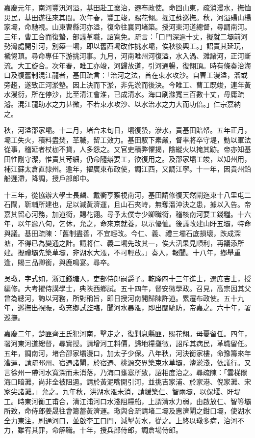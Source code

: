 \begin{pinyinscope}
嘉慶元年，南河豐汛河溢，基田赴工襄治，遷布政使。命回山東，疏消漫水，撫恤災民，基田遂往來其間。次年春，豐工竣，賜花翎。擢江蘇巡撫。秋，河溢碭山楊家壩，命馳視。山東曹縣河亦溢，復命往襄同堵築。授河東河道總督，尋調南河。三年，曹工合而復蟄，部議革職，詔寬免。疏言：「口門深逾十丈，擬就二壩前河勢灣處開引河，別築一壩，即以舊西壩改作挑水壩，俟秋後興工。」詔責其延玩，褫翎頂。尋命專任下游挑河事。九月，河南睢州河復溢，水入渦、濉諸河，正河斷流。大工旋合。次年春，睢工亦竣，河歸故道，引河通暢，復翎頂。時有條奏治海口及復舊制混江龍者，基田疏言：「治河之法，首在束水攻沙。自曹工漫溢，溜或旁趨，遂致正河淤墊。因上決而下淤，非先淤而後決。今睢工、曹工既竣，連年黃水漫衍，所在停沙，比至清江會淮，已成清水。海口刷滌寬三百數十丈，毋庸疏濬。混江龍助水之力甚微，不若束水攻沙、以水治水之力大而功倍。」仁宗嘉納之。

秋，河溢邵家壩。十二月，堵合未旬日，壩復蟄，滲水，責基田賠帑。五年正月，壩工失火，積料盡焚，革職，留工效力。基田馭下素嚴，督率將卒守堤，動以軍法從事，稽延者杖枷不貸，人多怨之。又官吏積弊懼揭，陰縱火以掩其跡。帝亦知基田性剛守潔，惟責其苛細，仍命隨辦要工，欲復用之。及邵家壩工竣，以知州用，補江蘇太倉直隸州。逾年，擢廣東布政使，調江西，又調江寧。十一年，因貴州鉛船遲滯，降調，授戶部郎中。

十三年，從協辦大學士長麟、戴衢亨察視南河，基田請修復天然閘迤東十八里屯二石閘，靳輔所建也，足以減黃濟運，且山石夾峙，無奪溜沖決之患，據以入告。帝嘉其留心河務，加道銜，賜花翎。尋予太僕寺少卿職銜，稽核南河要工錢糧。十六年，以年逾八旬，乞休，允之，命來京就養，以示優恤。後議改建山盱五壩，特命與議。基田疏陳：「舊制盡善，不宜輕改。今仁、義、禮三壩石底損壞，跌成深塘，不得已為變通之計。請將仁、義二壩先改其一，俟大汛果見順利，再議添所建。擬禮壩先築草壩，非湖水大漲，不可輕放。」奏入，報聞。十八年，鄉舉重逢，賜三品卿銜，與鹿鳴宴。尋卒。

吳璥，字式如，浙江錢塘人，吏部侍郎嗣爵子。乾隆四十三年進士，選庶吉士，授編修。大考擢侍講學士，典陜西鄉試。五十四年，督安徽學政。召見，高宗因其父曾為總河，詢以河務，所對稱旨，即日授河南開歸陳許道。累遷布政使。五十九年，巡撫出視賑，璥充鄉試監臨，聞河水暴漲，即出闈馳防，帝嘉之。六十年，署巡撫。

嘉慶二年，楚匪齊王氏犯河南，擊走之，復剿息縣匪，賜花翎。母憂留任。四年，署河東河道總督，尋實授。請增河工料價，歸地糧攤徵，詔斥其病民，革職留任。五年，調南河，堵合邵家壩漫口，加太子少保。八年秋，河決衡家樓，命豫籌來年漕運，請疏邳州、宿遷諸閘，於宿遷、桃源交界築束水草壩，濬淤淺，依議行。又言徐州一帶河水寬深而未消落，乃海口壅塞所致，詔相度治之。尋疏陳：「雲梯關海口暗灘，尚非全被阻遏。請於黃泥嘴開引河，並挑吉家浦、於家港、倪家灘、宋家尖諸灘。」允之。九年秋，洪湖水漲未消，請緩築仁、智兩壩，以保堰、盱堤工。時東河衡工甫合，清江浦河口水淺阻糧船，上謂清水力弱，由啟放仁、智等壩所致，命侍郎姜晟往會籌蓄黃濟運。璥與合疏請堵二壩及惠濟閘之鉗口壩，使湖水全力東注，刷通河口，並啟李工口門，減掣黃水，從之。上終以璥多病，治河不力，雖宥其罪，命解職。十年，授兵部侍郎，調倉場侍郎。


\end{pinyinscope}
